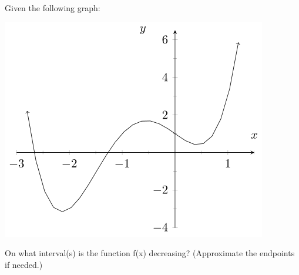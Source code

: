 \documentclass{ximera}
\begin{document}
\begin{problem}
    Given the following graph:  
    \begin{center}
        \includegraphics{./Picture13.png}
    \end{center}
    On what interval(s) is the function f(x) decreasing? (Approximate the endpoints if needed.)
    \begin{multipleChoice}
    \end{multipleChoice}
\end{problem}
\end{document}
